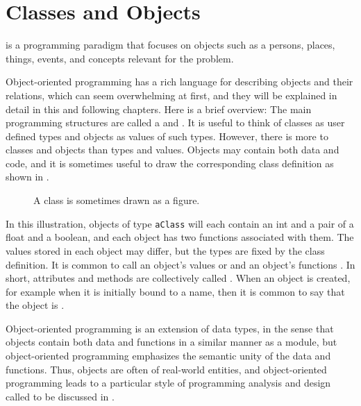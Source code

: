 \chapter{Classes and Objects}
\label{chap:oop}

 is a programming paradigm that focuses on objects such as a persons, places, things, events, and concepts relevant for the problem.

Object-oriented programming has a rich language for describing objects and their relations, which can seem overwhelming at first, and they will be explained in detail in this and following chapters. Here is a brief overview: The main programming structures are called a  and . It is useful to think of classes as user defined types and objects as values of such types. However, there is more to classes and objects than types and values. Objects may contain both data and code, and it is sometimes useful to draw the corresponding class definition as shown in .
\begin{figure}[h]
  \centering
  \caption{A class is sometimes drawn as a figure.}
  \label{fig:aClass}
\end{figure}
In this illustration, objects of type \lstinline{aClass} will each contain an int and a pair of a float and a boolean, and each object has two functions associated with them. The values stored in each object may differ, but the types are fixed by the class definition. It is common to call an object's values  or  and an object's functions . In short, attributes and methods are collectively called . When an object is created, for example when it is initially bound to a name, then it is common to say that the object is .

Object-oriented programming is an extension of data types, in the sense that objects contain both data and functions in a similar manner as a module, but object-oriented programming emphasizes the semantic unity of the data and functions. Thus, objects are often  of real-world entities, and object-oriented programming leads to a particular style of programming analysis and design called  to be discussed in . 

